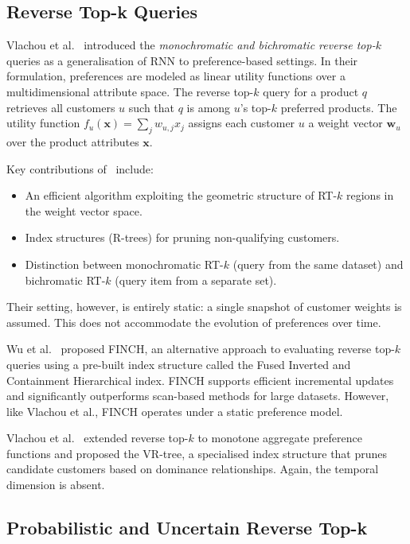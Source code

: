 \subsection{Reverse Top-k Queries}

Vlachou et al.~\cite{vlachou2010reverse} introduced the \textit{monochromatic and bichromatic reverse top-$k$} queries as a generalisation of RNN to preference-based settings. In their formulation, preferences are modeled as linear utility functions over a multidimensional attribute space. The reverse top-$k$ query for a product $q$ retrieves all customers $u$ such that $q$ is among $u$'s top-$k$ preferred products. The utility function $f_u(\mathbf{x}) = \sum_j w_{u,j} x_j$ assigns each customer $u$ a weight vector $\mathbf{w}_u$ over the product attributes $\mathbf{x}$.

Key contributions of~\cite{vlachou2010reverse} include:
\begin{itemize}
  \item An efficient algorithm exploiting the geometric structure of RT-$k$ regions in the weight vector space.
  \item Index structures (R-trees) for pruning non-qualifying customers.
  \item Distinction between monochromatic RT-$k$ (query from the same dataset) and bichromatic RT-$k$ (query item from a separate set).
\end{itemize}

Their setting, however, is entirely static: a single snapshot of customer weights is assumed. This does not accommodate the evolution of preferences over time.

Wu et al.~\cite{wu2009finch} proposed FINCH, an alternative approach to evaluating reverse top-$k$ queries using a pre-built index structure called the Fused Inverted and Containment Hierarchical index. FINCH supports efficient incremental updates and significantly outperforms scan-based methods for large datasets. However, like Vlachou et al., FINCH operates under a static preference model.

Vlachou et al.~\cite{vlachou2011monotone} extended reverse top-$k$ to monotone aggregate preference functions and proposed the VR-tree, a specialised index structure that prunes candidate customers based on dominance relationships. Again, the temporal dimension is absent.

\subsection{Probabilistic and Uncertain Reverse Top-k}

